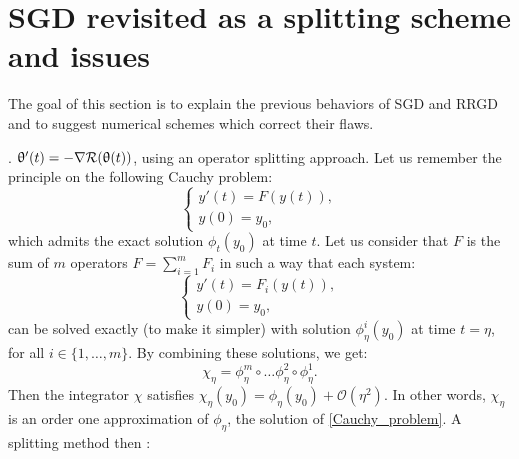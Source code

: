 \documentclass[article,authoryear,jmlmc]{beg_32}             %
\begin{document}
\section{SGD revisited as a splitting scheme and issues}
\label{section_splitting_schemes}

The goal of this section is to explain the previous behaviors of SGD and RRGD and to suggest numerical schemes which correct their flaws. 

 \cite{SDE_comparison,SDE_modified,SDE_edp,malladi_adam,hu2018diffusion,flat_minima_exponential,yang2020fast,sgd_implicit_regularisation,sgd_implicit_regularisation2}. 
$\uptheta'(t)=-\nabla \mathcal{R}(\uptheta(t))$, using an operator splitting approach. Let us remember the principle on the following Cauchy problem:
\begin{equation}
	\left\{
	\begin{array}{ll}
		y'(t) = F(y(t)), \\
		y(0) = y_0,
	\end{array}
	\right.
	\label{Cauchy_problem}
\end{equation}
which admits the exact solution $\phi_t(y_0)$ at time $t$. Let us consider that $F$ is the sum of $m$ operators $F=\displaystyle{\sum_{i=1}^m}F_i$ in such a way that each system:
\begin{equation*}
	\left\{
	\begin{array}{ll}
		y'(t) = F_i(y(t)), \\
		y(0) = y_0,
	\end{array}
	\right.
\end{equation*}
can be solved exactly (to make it simpler)  with solution $\phi_{\eta}^i(y_0)$ at time $t=\eta$, for all $i\in \{1,\dots,m\}$. By combining these solutions, we get:
\begin{equation}
	\chi_{\eta} = \phi_{\eta}^m \circ \dots \phi_{\eta}^2 \circ \phi_{\eta}^1.
	\label{splitting_lie_trotter}
\end{equation} 
Then the integrator $\chi$ satisfies $\chi_{\eta}(y_0) = \phi_{\eta}(y_0) + \mathcal{O}(\eta^2)$. In other words, $\chi_{\eta}$ is an order one approximation of $\phi_{\eta}$, the
solution of \eqref{Cauchy_problem}. A splitting method then :
\end{document}
